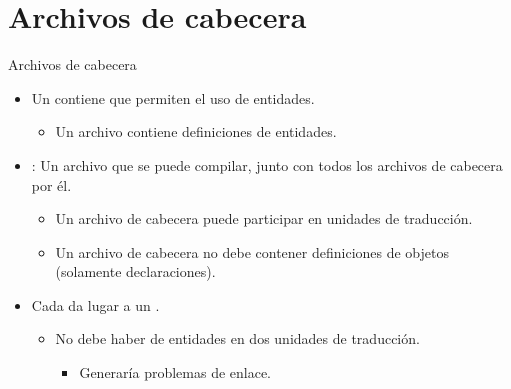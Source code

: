 \section{Archivos de cabecera}

\begin{frame}[t]{Archivos de cabecera}
\begin{itemize}
  \item Un  contiene  
        que permiten el uso de entidades.
    \begin{itemize}
      \item Un archivo  contiene definiciones de entidades.
    \end{itemize}

  \item {}: Un archivo que se puede compilar, junto con
        todos los archivos de cabecera  por él.
    \begin{itemize}
      \item Un archivo de cabecera puede participar en  
            unidades de traducción.
      \item Un archivo de cabecera no debe contener definiciones de objetos 
            (solamente declaraciones).
    \end{itemize}

  \item Cada  da lugar a un .
    \begin{itemize}
      \item No debe haber  de entidades en dos 
            unidades de traducción.
        \begin{itemize}
          \item Generaría problemas de enlace.
        \end{itemize}
    \end{itemize}
\end{itemize}
\end{frame}

